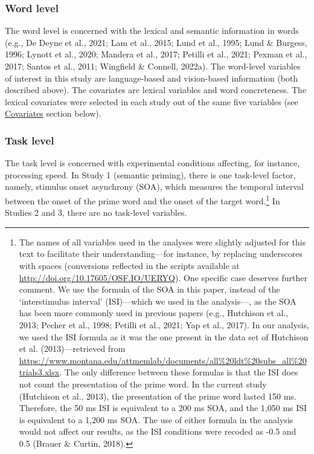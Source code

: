 \documentclass[
  12pt,
  man,floatsintext]{apa7}
\begin{document}
\hypertarget{word-level}{%
\subsubsection{Word level}\label{word-level}}

The word level is concerned with the lexical and semantic information in words (e.g., De Deyne et al., 2021; Lam et al., 2015; Lund et al., 1995; Lund \& Burgess, 1996; Lynott et al., 2020; Mandera et al., 2017; Petilli et al., 2021; Pexman et al., 2017; Santos et al., 2011; Wingfield \& Connell, 2022a). The word-level variables of interest in this study are language-based and vision-based information (both described above). The covariates are lexical variables and word concreteness. The lexical covariates were selected in each study out of the same five variables (see \protect\hyperlink{covariates}{\underline{Covariates}} section below).

\hypertarget{task-level}{%
\subsubsection{Task level}\label{task-level}}

The task level is concerned with experimental conditions affecting, for instance, processing speed. In Study 1 (semantic priming), there is one task-level factor, namely, stimulus onset asynchrony (SOA), which measures the temporal interval between the onset of the prime word and the onset of the target word.\footnote{The names of all variables used in the analyses were slightly adjusted for this text to facilitate their understanding---for instance, by replacing underscores with spaces (conversions reflected in the scripts available at \url{http://doi.org/10.17605/OSF.IO/UERYQ}). One specific case deserves further comment. We use the formula of the SOA in this paper, instead of the `interstimulus interval' (ISI)---which we used in the analysis---, as the SOA has been more commonly used in previous papers (e.g., Hutchison et al., 2013; Pecher et al., 1998; Petilli et al., 2021; Yap et al., 2017). In our analysis, we used the ISI formula as it was the one present in the data set of Hutchison et al. (2013)---retrieved from \url{https://www.montana.edu/attmemlab/documents/all\%20ldt\%20subs_all\%20trials3.xlsx}. The only difference between these formulas is that the ISI does not count the presentation of the prime word. In the current study (Hutchison et al., 2013), the presentation of the prime word lasted 150 ms. Therefore, the 50 ms ISI is equivalent to a 200 ms SOA, and the 1,050 ms ISI is equivalent to a 1,200 ms SOA. The use of either formula in the analysis would not affect our results, as the ISI conditions were recoded as -0.5 and 0.5 (Brauer \& Curtin, 2018).} In Studies 2 and 3, there are no task-level variables.
\end{document}
